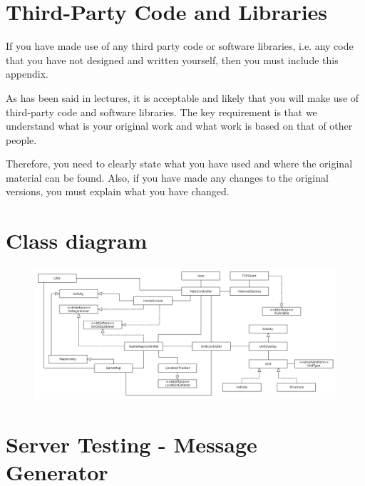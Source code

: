 \chapter{Third-Party Code and Libraries}

If you have made use of any third party code or software libraries, i.e. any code that you have not designed and written yourself, then you must include this appendix. 

As has been said in lectures, it is acceptable and likely that you will make use of third-party code and software libraries. The key requirement is that we understand what is your original work and what work is based on that of other people. 

Therefore, you need to clearly state what you have used and where the original material can be found. Also, if you have made any changes to the original versions, you must explain what you have changed. 


\chapter{Class diagram}\label{ap_class}

\begin{figure}[H]
  \centering
  \includegraphics[height=0.3\textheight, angle=90]{Images/diagrams/class.png}
\end{figure}



\chapter{Server Testing - Message Generator}\label{server_testing}

